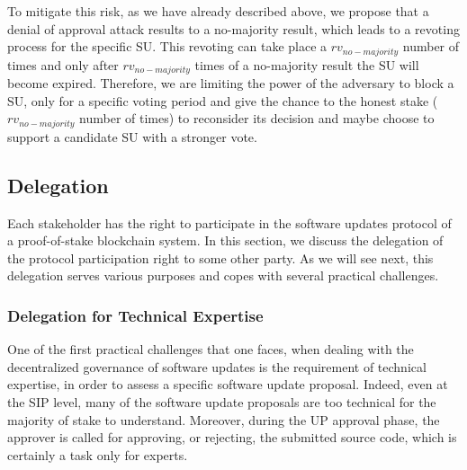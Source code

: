 To mitigate this risk, as we have already described above, we propose that a denial of approval attack results to a no-majority result, which leads to a revoting process for the specific SU. This revoting can take place a $rv_{no-majority}$ number of times and only after $rv_{no-majority}$ times of a no-majority result the SU will become expired. Therefore, we are limiting the power of the adversary to block a SU, only for a specific voting period and give the chance to the honest stake ($rv_{no-majority}$ number of times) to reconsider its decision and maybe choose to support a candidate SU with a stronger vote.


\subsection{Delegation} \label{appxdelegation}
Each stakeholder has the right to participate in the software updates protocol of a proof-of-stake blockchain system.
In this section, we discuss the delegation of the protocol participation right to some other party. As we will see next, this delegation serves various purposes and copes with several practical challenges.
\subsubsection{Delegation for Technical Expertise}\label{delfortech}
One of the first practical challenges that one faces, when dealing with the decentralized governance of software updates is the requirement of technical expertise, in order to assess a specific software update proposal. Indeed, even at the SIP level, many of the software update proposals are too technical for the majority of stake to understand. Moreover, during the UP approval phase, the approver is called for approving, or rejecting, the submitted source code, which is certainly a task only for experts.

